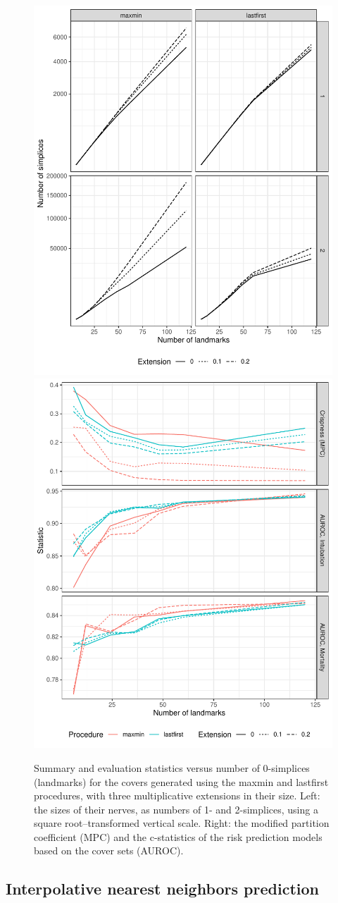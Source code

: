 \documentclass[
]{article}
\begin{document}
\begin{figure}
\includegraphics[width=.5\textwidth]{../figures/cover-simplices-mx}
\includegraphics[width=.5\textwidth]{../figures/cover-evaluate-mx}
\caption{
Summary and evaluation statistics versus number of 0-simplices (landmarks) for the covers generated using the maxmin and lastfirst procedures, with three multiplicative extensions in their size.
Left: the sizes of their nerves, as numbers of 1- and 2-simplices, using a square root--transformed vertical scale.
Right: the modified partition coefficient (MPC) and the c-statistics of the risk prediction models based on the cover sets (AUROC).
\label{fig:cover-mx}
}
\end{figure}

\hypertarget{interpolative-nearest-neighbors-prediction}{%
\subsection{Interpolative nearest neighbors
prediction}\label{interpolative-nearest-neighbors-prediction}}
\end{document}
